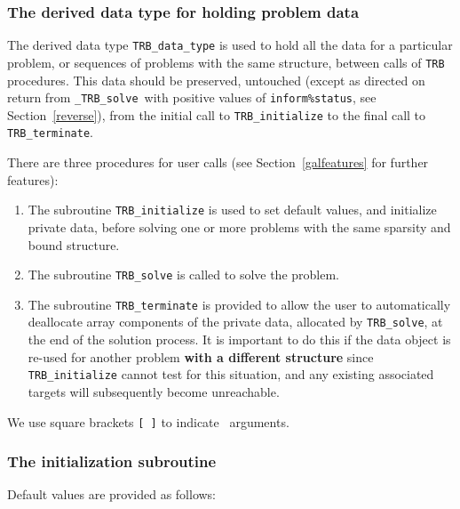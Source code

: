 \documentclass{galahad}
\newcommand{\packagename}{TRB}
\newcommand{\fullpackagename}{\libraryname\_\packagename}
\newcommand{\solver}{{\tt \fullpackagename\_solve}}
\begin{document}

\subsubsection{The derived data type for holding problem data}\label{typedata}
The derived data type
{\tt \packagename\_data\_type}
is used to hold all the data for a particular problem,
or sequences of problems with the same structure, between calls of
{\tt \packagename} procedures.
This data should be preserved, untouched (except as directed on
return from \solver\ with positive values of {\tt inform\%status}, see
Section~\ref{reverse}),
from the initial call to
{\tt \packagename\_initialize}
to the final call to
{\tt \packagename\_terminate}.





\galarguments
There are three procedures for user calls
(see Section~\ref{galfeatures} for further features):

\begin{enumerate}
\item The subroutine
      {\tt \packagename\_initialize}
      is used to set default values, and initialize private data,
      before solving one or more problems with the
      same sparsity and bound structure.
\item The subroutine
      {\tt \packagename\_solve}
      is called to solve the problem.
\item The subroutine
      {\tt \packagename\_terminate}
      is provided to allow the user to automatically deallocate array
       components of the private data, allocated by
       {\tt \packagename\_solve},
       at the end of the solution process.
       It is important to do this if the data object is re-used for another
       problem {\bf with a different structure}
       since {\tt \packagename\_initialize} cannot test for this situation,
       and any existing associated targets will subsequently become unreachable.
\end{enumerate}
We use square brackets {\tt [ ]} to indicate \optional\ arguments.


\subsubsection{The initialization subroutine}\label{subinit}
 Default values are provided as follows:
\vspace*{1mm}
\end{document}
